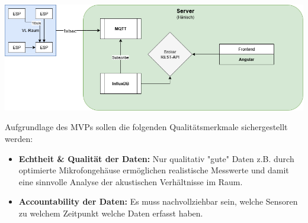 \begin{center}
  \includegraphics[width=1\textwidth]{../images/MVPVisualisierung.png}
\end{center}

Aufgrundlage des MVPs sollen die folgenden Qualitätsmerkmale sichergestellt werden:
\begin{itemize}
    \item \textbf{Echtheit \& Qualität der Daten:}
    Nur qualitativ "gute" Daten z.B. durch optimierte Mikrofongehäuse ermöglichen realistische Messwerte und damit eine sinnvolle Analyse der akustischen Verhältnisse im Raum.
    \item \textbf{Accountability der Daten:}
    Es muss nachvollziehbar sein, welche Sensoren zu welchem Zeitpunkt welche Daten erfasst haben.
\end{itemize}
